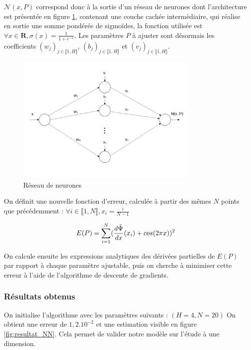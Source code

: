 \documentclass{article}
\begin{document}
${\mathcal{N}}(x,P)$ correspond donc à la sortie d'un réseau de neurones dont l'architecture est présentée en figure \ref{fig:NN}, contenant une couche cachée intermèdiaire, qui réalise en sortie une somme pondérée de sigmoïdes, la fonction utilisée est $\forall x \in \mathbf{R}, \sigma(x) = \frac{1}{1+e^{-x}}$. Les paramètres $P$ à ajuster sont désormais les coefficients $(w_j)_{j\in \llbracket 1,H \rrbracket}$, $(b_j)_{j\in \llbracket 1,H \rrbracket}$ et $(v_j)_{j\in \llbracket 1,H \rrbracket}$.

\begin{figure}
\centering
\includegraphics[width=0.8\textwidth]{NN.jpg}
\caption{\label{fig:NN}Réseau de neurones}
\end{figure}

On définit une nouvelle fonction d'erreur, calculée à partir des mêmes $N$ points que précédemment : $\forall i \in\llbracket 1,N \rrbracket, x_i = \frac{i}{N-1} $

\begin{equation}
        E(P) = \sum_{i=1}^{N} (\frac{d\Tilde{\Psi}}{dx}(x_i) + cos(2\pi x))^2
\label{eq:erreur NN}
\end{equation}

On calcule ensuite les expressions analytiques des dérivées partielles de $E(P)$ par rapport à chaque paramètre ajustable, puis on cherche à minimiser cette erreur à l'aide de l'algorithme de descente de gradients.

\subsubsection{Résultats obtenus}
On initialise l'algorithme avec les paramètres suivants :
$(H=4, N=20)$
On obtient une erreur de $1,2.10^{-2}$ et une estimation visible en figure \ref{fig:resultat_NN}. Cela permet de valider notre modèle sur l'étude à une dimension.
\end{document}
